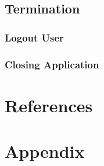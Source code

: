 \documentclass{article}
\begin{document}
        \subsection{Termination}
            \subsubsection{Logout User}

            \subsubsection{Closing Application}

    \section*{References}

    \appendix
    \section{Appendix}
\end{document}
